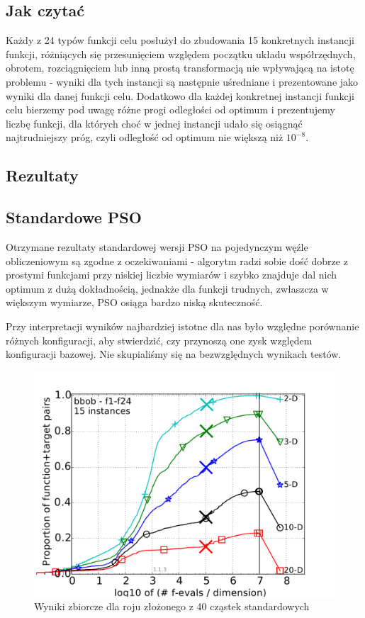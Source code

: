 \documentclass[12pt, twoside, openany, abstract=on]{report}
\theoremstyle{definition}
\begin{document}
\subsection{Jak czytać}
Każdy z 24 typów funkcji celu posłużył do zbudowania 15 konkretnych instancji funkcji, różniących się przesunięciem względem początku układu współrzędnych, obrotem, rozciągnięciem lub inną prostą transformacją nie wpływającą na istotę problemu - wyniki dla tych instancji są następnie uśredniane i prezentowane jako wyniki dla danej funkcji celu. Dodatkowo dla każdej konkretnej instancji funkcji celu bierzemy pod uwagę różne progi odległości od optimum i prezentujemy liczbę funkcji, dla których choć w jednej instancji udało się osiągnąć najtrudniejszy próg, czyli odległość od optimum nie większą niż $10^{-8}$.

\subsection{Rezultaty}

\subsection{Standardowe PSO}
Otrzymane rezultaty standardowej wersji PSO na pojedynczym węźle obliczeniowym są zgodne z oczekiwaniami - algorytm radzi sobie dość dobrze z prostymi funkcjami przy niskiej liczbie wymiarów i szybko znajduje dal nich optimum z dużą dokładnością, jednakże dla funkcji trudnych, zwłaszcza w większym wymiarze, PSO osiąga bardzo niską skuteczność.

Przy interpretacji wyników najbardziej istotne dla nas było względne porównanie różnych konfiguracji, aby stwierdzić, czy przynoszą one zysk względem konfiguracji bazowej. Nie skupialiśmy się na bezwzględnych wynikach testów.

\begin{figure}[H]
    \centering
    \includegraphics[scale=1]{charts/1node40st.pdf} 
 \caption{Wyniki zbiorcze dla roju złożonego z 40 cząstek standardowych}
\end{figure}
\end{document}
